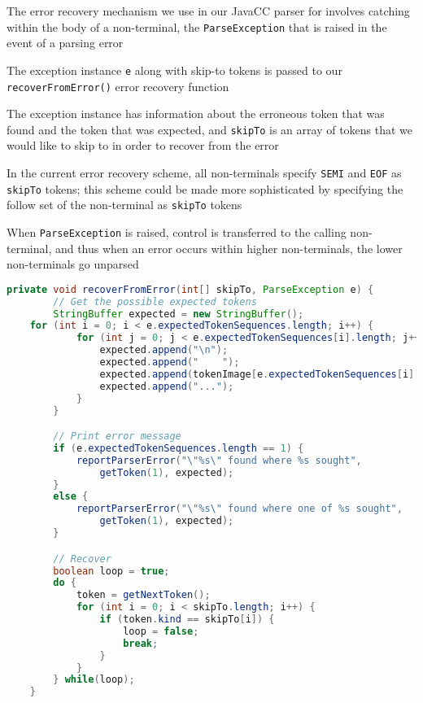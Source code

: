 \documentclass[8pt,a4paper,compress,handout]{beamer}
\begin{document}
\begin{frame}[fragile]
\pause

The error recovery mechanism we use in our JavaCC parser for \jmm involves catching within the body of a non-terminal, the \lstinline{ParseException} that is raised in the event of a parsing error

\pause
\bigskip

The exception instance \lstinline{e} along with skip-to tokens is passed to our \lstinline{recoverFromError()} error recovery function

\pause
\bigskip

The exception instance has information about the erroneous token that was found and the token that was expected, and \lstinline{skipTo} is an array of tokens that we would like to skip to in order to recover from the error

\pause
\bigskip

In the current error recovery scheme, all non-terminals specify \lstinline{SEMI} and \lstinline{EOF} as \lstinline{skipTo} tokens; this scheme could be made more sophisticated by specifying the follow set of the non-terminal as \lstinline{skipTo} tokens

\pause
\bigskip

When \lstinline{ParseException} is raised, control is transferred to the calling non-terminal, and thus when an error occurs within higher non-terminals, the lower non-terminals go unparsed
\end{frame}

\begin{frame}[fragile]
\pause

\begin{lstlisting}[language=Java]
    private void recoverFromError(int[] skipTo, ParseException e) {
        // Get the possible expected tokens
        StringBuffer expected = new StringBuffer();
	for (int i = 0; i < e.expectedTokenSequences.length; i++) {
            for (int j = 0; j < e.expectedTokenSequences[i].length; j++) {
                expected.append("\n");
                expected.append("    ");
                expected.append(tokenImage[e.expectedTokenSequences[i][j]]);
                expected.append("...");
            }
        }

        // Print error message
        if (e.expectedTokenSequences.length == 1) {
            reportParserError("\"%s\" found where %s sought",                   
                getToken(1), expected);
        }
        else {
            reportParserError("\"%s\" found where one of %s sought",            
                getToken(1), expected);
        }

        // Recover
        boolean loop = true;
        do {
            token = getNextToken();
            for (int i = 0; i < skipTo.length; i++) {
                if (token.kind == skipTo[i]) {
                    loop = false;
                    break;
                }
            }
        } while(loop);
    }
\end{lstlisting}
\end{frame}
\end{document}

